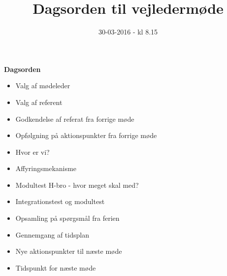 \documentclass{article}
\title{Dagsorden til vejledermøde}
\date{30-03-2016 - kl 8.15}
\begin{document}
	\maketitle
	\textbf{Dagsorden}
	
	\begin{itemize}
		\item Valg af mødeleder
		\item Valg af referent
		\item Godkendelse af referat fra forrige møde 
		\item Opfølgning på aktionspunkter fra forrige møde
		\item Hvor er vi? 
		\item Affyringsmekanisme
		\item Modultest H-bro - hvor meget skal med? 
		\item Integrationstest og modultest
		\item Opsamling på spørgsmål fra ferien
		\item Gennemgang af tidsplan
		\item Nye aktionspunkter til næste møde
		\item Tidspunkt for næste møde
	\end{itemize}
\end{document}
